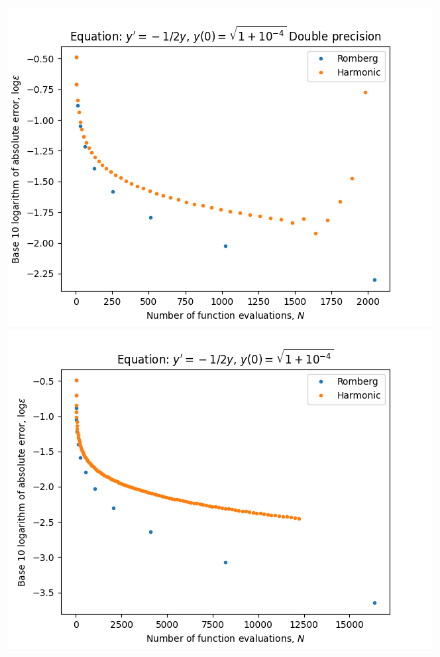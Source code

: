 \begin{figure}[H]
\centering
\begin{minipage}{0.45\textwidth}
\centering
\includegraphics[scale=0.45]{../results/emr_plots/quad_sing_4.png}
\end{minipage}
\begin{minipage}{0.45\textwidth}
\centering
\includegraphics[scale=0.45]{../results/emr_plots/quad_sing_4_hp.png}
\end{minipage}
\end{figure}

